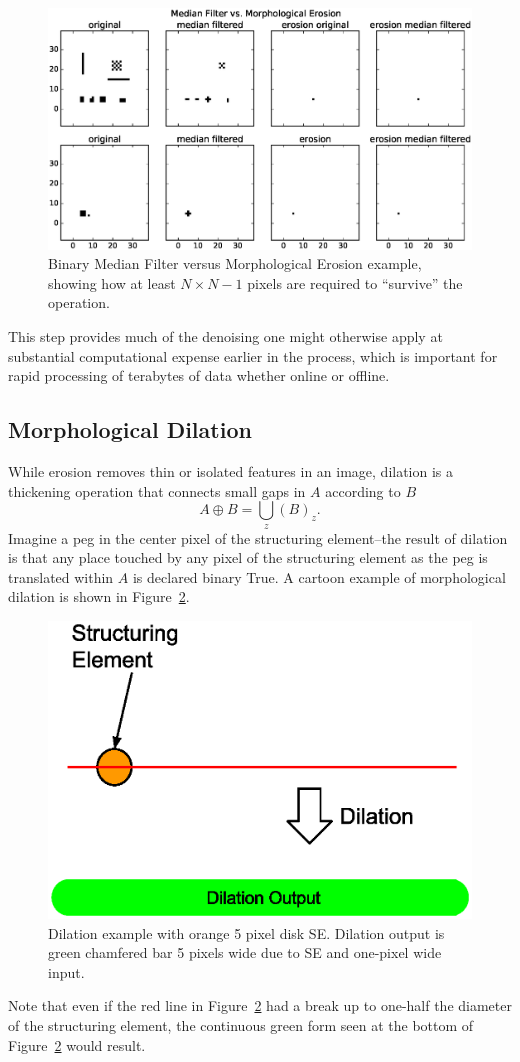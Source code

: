 \begin{figure}\centering
    \includegraphics[width=0.75\columnwidth]{gfx/medfilt}
    \caption{Binary Median Filter versus Morphological Erosion example, showing how at least $N \times N-1$ pixels are required to ``survive'' the operation.}\label{fig:medfilt}
\end{figure}
This step provides much of the denoising one might otherwise apply at substantial computational expense earlier in the process, which is important for rapid processing of terabytes of data whether online or offline.

\subsection{Morphological Dilation}\label{sec:dilate}
While erosion removes thin or isolated features in an image, dilation is a thickening operation that connects small gaps in $A$ according to $B$
\begin{equation}\label{eq:dilate}
A \oplus B = \bigcup_z (B)_z.
\end{equation}
Imagine a peg in the center pixel of the structuring element--the result of dilation is that any place touched by any pixel of the structuring element as the peg is translated within $A$ is declared binary True.
A cartoon example of morphological dilation is shown in Figure~\ref{fig:dilate}. 
\begin{figure}\centering
    \includegraphics[width=0.7\linewidth,trim=10 0 10 0,clip]{gfx/dilate}
    \caption{Dilation example with orange 5 pixel disk SE. 
            Dilation output is green chamfered bar 5 pixels wide due to SE and one-pixel wide input.}\label{fig:dilate}
\end{figure}
Note that even if the red line in Figure~\ref{fig:dilate} had a break up to one-half the diameter of the structuring element, the continuous green form seen at the bottom of Figure~\ref{fig:dilate} would result. 

